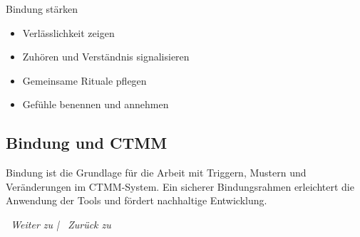 \begin{ctmmGreenBox}{Bindung stärken}
\begin{itemize}
  \item Verlässlichkeit zeigen
  \item Zuhören und Verständnis signalisieren
  \item Gemeinsame Rituale pflegen
  \item Gefühle benennen und annehmen
\end{itemize}
\end{ctmmGreenBox}

\subsection*{\texorpdfstring{\textcolor{ctmmBlue}{Bindung und CTMM}}{Bindung und CTMM}}
Bindung ist die Grundlage für die Arbeit mit Triggern, Mustern und Veränderungen im CTMM-System. Ein sicherer Bindungsrahmen erleichtert die Anwendung der Tools und fördert nachhaltige Entwicklung.

\vspace{1cm}
\begin{center}
\textit{\textcolor{ctmmGreen}{\faChevronRight~Weiter zu}  | \textcolor{ctmmBlue}{\faChevronLeft~Zurück zu} }
\end{center}
